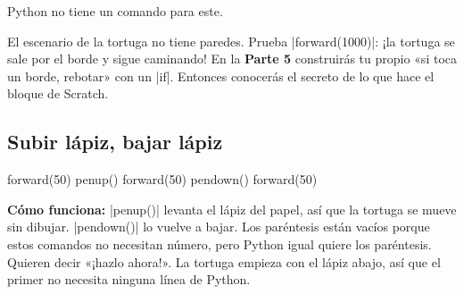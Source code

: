 \begin{tcbraster}[raster columns=2, raster equal height=rows, raster column skip=12pt, raster valign=center]
\begin{tcolorbox}[colback=white, colframe=white, boxrule=0pt, valign=center]
\begin{scratch}
\end{scratch}
\end{tcolorbox}
\begin{tcolorbox}[colback=warnbg, colframe=warnframe, boxrule=0.6pt, arc=5pt]
Python no tiene un comando para este.
\end{tcolorbox}
\end{tcbraster}

El escenario de la tortuga no tiene paredes. Prueba \py|forward(1000)|: ¡la tortuga se sale por el borde y sigue caminando! En la \textbf{Parte 5} construirás tu propio «si toca un borde, rebotar» con un \py|if|. Entonces conocerás el secreto de lo que hace el bloque de Scratch.

\subsection*{Subir lápiz, bajar lápiz}

\begin{tcbraster}[raster columns=2, raster equal height=rows, raster column skip=12pt, raster valign=center]
\begin{tcolorbox}[colback=white, colframe=white, boxrule=0pt, valign=center]
\begin{scratch}
\end{scratch}
\end{tcolorbox}
\begin{code}
forward(50)
penup()
forward(50)
pendown()
forward(50)
\end{code}
\end{tcbraster}

\textbf{Cómo funciona:} \py|penup()| levanta el lápiz del papel, así que la tortuga se mueve sin dibujar. \py|pendown()| lo vuelve a bajar. Los paréntesis están vacíos porque estos comandos no necesitan número, pero Python igual quiere los paréntesis. Quieren decir «¡hazlo ahora!». La tortuga empieza con el lápiz abajo, así que el primer  no necesita ninguna línea de Python.

